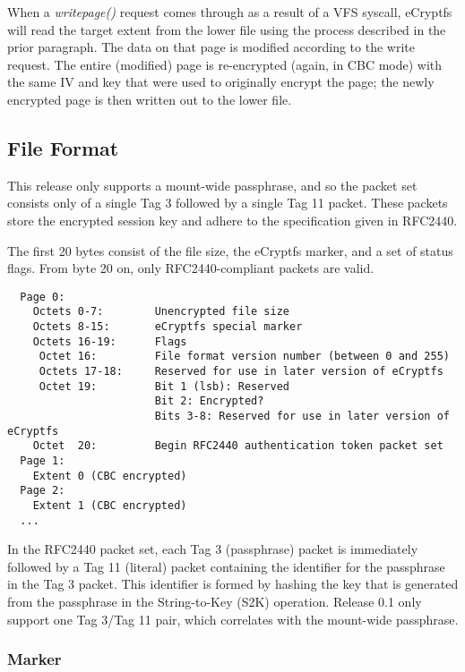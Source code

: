\documentclass{article}
\begin{document}
When a \emph{writepage()} request comes through as a result of a VFS
syscall, eCryptfs will read the target extent from the lower file
using the process described in the prior paragraph. The data on that
page is modified according to the write request. The entire (modified)
page is re-encrypted (again, in CBC mode) with the same IV and key
that were used to originally encrypt the page; the newly encrypted
page is then written out to the lower file.

\subsection{File Format}

This release only supports a mount-wide passphrase, and so the packet
set consists only of a single Tag 3 followed by a single Tag 11
packet. These packets store the encrypted session key and adhere to
the specification given in RFC2440.

The first 20 bytes consist of the file size, the eCryptfs marker, and
a set of status flags. From byte 20 on, only RFC2440-compliant packets
are valid.

\scriptsize
\begin{verbatim}
  Page 0:
    Octets 0-7:        Unencrypted file size
    Octets 8-15:       eCryptfs special marker
    Octets 16-19:      Flags
     Octet 16:         File format version number (between 0 and 255)
     Octets 17-18:     Reserved for use in later version of eCryptfs
     Octet 19:         Bit 1 (lsb): Reserved 
                       Bit 2: Encrypted?
                       Bits 3-8: Reserved for use in later version of eCryptfs
    Octet  20:         Begin RFC2440 authentication token packet set
  Page 1:
    Extent 0 (CBC encrypted)
  Page 2:
    Extent 1 (CBC encrypted)
  ...
\end{verbatim}
\normalsize

In the RFC2440 packet set, each Tag 3 (passphrase) packet is
immediately followed by a Tag 11 (literal) packet containing the
identifier for the passphrase in the Tag 3 packet. This identifier is
formed by hashing the key that is generated from the passphrase in the
String-to-Key (S2K) operation. Release 0.1 only support one Tag 3/Tag
11 pair, which correlates with the mount-wide passphrase.

\subsubsection{Marker}
\end{document}
